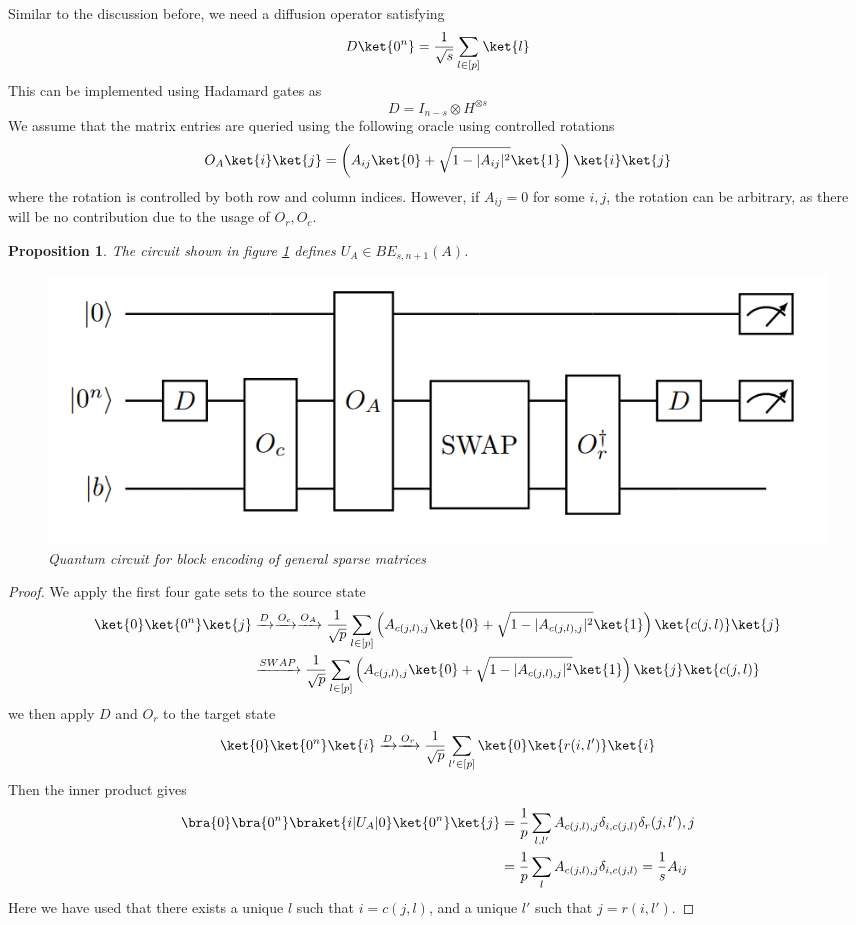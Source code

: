 \documentclass[12pt, oneside]{book}
\newtheorem{proposition}[theorem]{Proposition}
\theoremstyle{definition}
\theoremstyle{definition}
\theoremstyle{remark}
\begin{document}
Similar to the discussion before, we need a diffusion operator satisfying
\[
D\ket{0^n}=\frac{1}{\sqrt{s}}\sum_{l\in[p]}\ket{l}
\]
This can be implemented using Hadamard gates as
\[
D=I_{n-s}\otimes H^{\otimes s}
\]
We assume that the matrix entries are queried using the following oracle using controlled rotations
\[
O_A\ket{i}\ket{j}=\left(A_{ij}\ket{0}+\sqrt{1-|A_{ij}|^2}\ket{1}\right)\ket{i}\ket{j}
\]
where the rotation is controlled by both row and column indices. However, if $A_{ij}=0$ for some $i,j$, the rotation can be arbitrary, as there will be no contribution due to the usage of $O_r,O_c$.
\begin{proposition}
    The circuit shown in figure \ref{fig:generalsparseencoding} defines $U_A\in BE_{s,n+1}(A)$.
    \begin{figure}
        \centering
        \includegraphics[width=0.7\linewidth]{../images/generalsparseencoding.png}
        \caption{Quantum circuit for block encoding of general sparse matrices}
        \label{fig:generalsparseencoding}
    \end{figure}
\end{proposition}
\begin{proof}
    We apply the first four gate sets to the source state
    \begin{align*}
    \ket{0}\ket{0^n}\ket{j}&\xrightarrow{D}\xrightarrow{O_c}\xrightarrow{O_A}\frac{1}{\sqrt{p}}\sum_{l\in[p]}\left(A_{c(j,l),j}\ket{0}+\sqrt{1-|A_{c(j,l),j}|^2}\ket{1}\right)\ket{c(j,l)}\ket{j}\\
    &\xrightarrow{SWAP}\frac{1}{\sqrt{p}}\sum_{l\in[p]}\left(A_{c(j,l),j}\ket{0}+\sqrt{1-|A_{c(j,l),j}|^2}\ket{1}\right)\ket{j}\ket{c(j,l)}
    \end{align*}
    we then apply $D$ and $O_r$ to the target state
    \[
    \ket{0}\ket{0^n}\ket{i}\xrightarrow{D}\xrightarrow{O_r}\frac{1}{\sqrt{p}}\sum_{l'\in[p]}\ket{0}\ket{r(i,l')}\ket{i}
    \]
    Then the inner product gives
    \begin{align*}
    \bra{0}\bra{0^n}\braket{i|U_A|0}\ket{0^n}\ket{j}&=\frac{1}{p}\sum_{l,l'}A_{c(j,l),j}\delta_{i,c(j,l)}\delta_r(j,l'),j\\
    &=\frac{1}{p}\sum_lA_{c(j,l),j}\delta_{i,c(j,l)}=\frac{1}{s}A_{ij}
    \end{align*}
    Here we have used that there exists a unique $l$ such that $i=c(j,l)$, and a unique $l'$ such that $j=r(i,l')$.
\end{proof}
\end{document}
